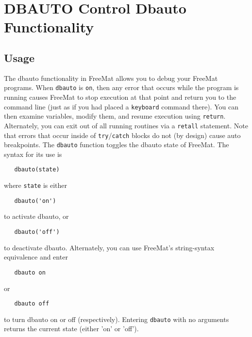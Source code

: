 \section{DBAUTO Control Dbauto Functionality}

\subsection{Usage}

The dbauto functionality in FreeMat allows you to debug your
FreeMat programs.  When \verb|dbauto| is \verb|on|, then any error
that occurs while the program is running causes FreeMat to 
stop execution at that point and return you to the command line
(just as if you had placed a \verb|keyboard| command there).  You can
then examine variables, modify them, and resume execution using
\verb|return|.  Alternately, you can exit out of all running routines
via a \verb|retall| statement.  Note that errors that occur inside of
\verb|try|/\verb|catch| blocks do not (by design) cause auto breakpoints.  The
\verb|dbauto| function toggles the dbauto state of FreeMat.  The
syntax for its use is
\begin{verbatim}
   dbauto(state)
\end{verbatim}
where \verb|state| is either
\begin{verbatim}
   dbauto('on')
\end{verbatim}
to activate dbauto, or
\begin{verbatim}
   dbauto('off')
\end{verbatim}
to deactivate dbauto.  Alternately, you can use FreeMat's string-syntax
equivalence and enter
\begin{verbatim}
   dbauto on
\end{verbatim}
or 
\begin{verbatim}
   dbauto off
\end{verbatim}
to turn dbauto on or off (respectively).  Entering \verb|dbauto| with no arguments
returns the current state (either 'on' or 'off').
